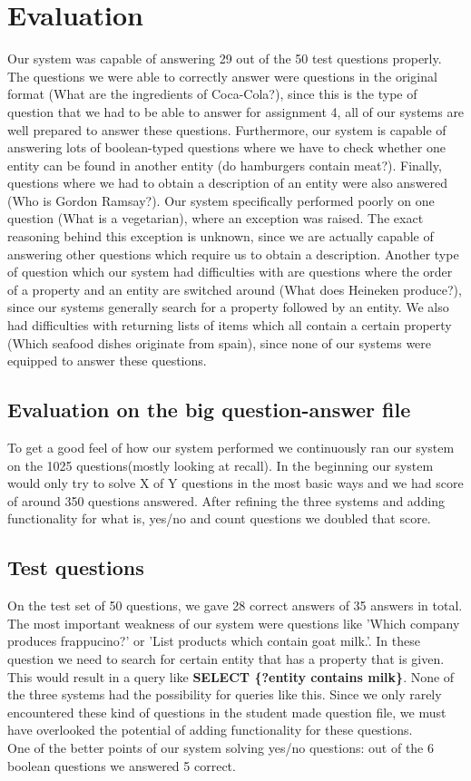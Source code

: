 \documentclass{article}
\begin{document}
\section*{Evaluation}
Our system was capable of answering 29 out of the 50 test questions properly. The questions we were able to correctly answer were questions in the original format (What are the ingredients of Coca-Cola?), since this is the type of question that we had to be able to answer for assignment 4, all of our systems are well prepared to answer these questions. Furthermore, our system is capable of answering lots of boolean-typed questions where we have to check whether one entity can be found in another entity (do hamburgers contain meat?). Finally, questions where we had to obtain a description of an entity were also answered (Who is Gordon Ramsay?). Our system specifically performed poorly on one question (What is a vegetarian), where an exception was raised. The exact reasoning behind this exception is unknown, since we are actually capable of answering other questions which require us to obtain a description.
Another type of question which our system had difficulties with are questions where the order of a property and an entity are switched around (What does Heineken produce?), since our systems generally search for a property followed by an entity.
We also had difficulties with returning lists of items which all contain a certain property (Which seafood dishes originate from spain), since none of our systems were equipped to answer these questions.

\subsection*{Evaluation on the big question-answer file}
To get a good feel of how our system performed we continuously ran our system on the 1025 questions(mostly looking at recall). In the beginning our system would only try to solve X of Y questions in the most basic ways and we had score of around 350 questions answered. After refining the three systems and adding functionality for what is, yes/no and count questions we doubled that score.
\subsection*{Test questions}
On the test set of 50 questions, we gave 28 correct answers of 35 answers in total. The most important weakness of our system were questions like 'Which company produces frappucino?' or 'List products which contain goat milk.'. In these question we need to search for certain entity that has a property that is given. This would result in a query like \textbf{SELECT \{?entity contains milk\}}. None of the three systems had the possibility for queries like this. Since we only rarely encountered these kind of questions in the student made question file, we must have overlooked the potential of adding functionality for these questions.\\
One of the better points of our system solving yes/no questions: out of the 6 boolean questions we answered 5 correct.
\end{document}
